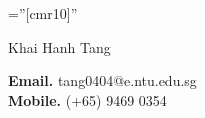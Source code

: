 \documentclass[a4paper, 11pt]{article}
\begin{document}
	
	
	\pagestyle{empty} %
	
	\font\fb=''[cmr10]'' %
	
	\par{\centering
		{\Huge Khai Hanh Tang
		}\bigskip\par}
	
	
	\textbf{Email.} tang0404@e.ntu.edu.sg\\
	\textbf{Mobile.} (+65) 9469 0354
	\begin{comment}
		\section{Personal Information}
		
		\begin{tabular}{rl}
			\textsc{Placeof Birth:} & Sadec City, Dong Thap Province, Vietnam \\
			\textsc{Date of Birth:} & September 16\textsuperscript{th} 1995 \\
			\textsc{Address:}   & University of Science, VNU-HCM\\
			& 227 Nguyen Van Cu, Ward 1, District 5, Ho Chi Minh city, Vietnam \\
			\textsc{Phone:}     & (+84) 905 718 507\\
			\textsc{email:}     &  \href{mailto:tang0404@e.ntu.edu.sg}{tang0404@e.ntu.edu.sg}
		\end{tabular}
	\end{comment}
\end{document}
